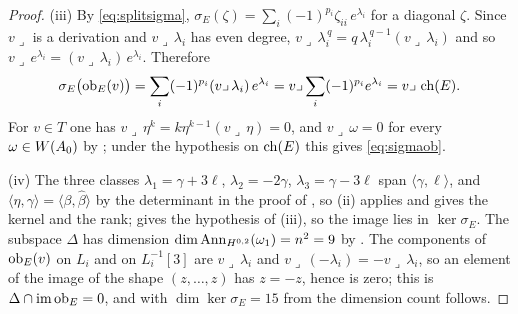 \begin{proof}
(iii) By \eqref{eq:splitsigma}, $\sigma_{E}(\zeta)=\sum_{i}(-1)^{p_{i}}
\zeta_{ii}\,e^{\lambda_{i}}$ for a diagonal $\zeta$. Since $v\lrcorner$ is a
derivation and $v\lrcorner\,\lambda_{i}$ has even degree,
$v\lrcorner\,\lambda_{i}^{\,q}=q\,\lambda_{i}^{\,q-1}(v\lrcorner\,\lambda_{i})$
and so $v\lrcorner\,e^{\lambda_{i}}=(v\lrcorner\,\lambda_{i})\,e^{\lambda_{i}}$.
Therefore
\[
  \sigma_{E}\bigl(\operatorname{ob}_{E}(v)\bigr)
  =\sum_{i}(-1)^{p_{i}}(v\lrcorner\,\lambda_{i})\,e^{\lambda_{i}}
  =v\lrcorner\sum_{i}(-1)^{p_{i}}e^{\lambda_{i}}
  =v\lrcorner\,\operatorname{ch}(E).
\]
For $v\in T$ one has $v\lrcorner\,\eta^{k}=k\eta^{k-1}(v\lrcorner\,\eta)=0$,
and $v\lrcorner\,\omega=0$ for every $\omega\in W(A_{0})$ by
\cite[Proposition~9.14]{paperI}; under the hypothesis on $\operatorname{ch}(E)$ this gives
\eqref{eq:sigmaob}.

(iv) The three classes $\lambda_{1}=\gamma+3\ell$, $\lambda_{2}=-2\gamma$,
$\lambda_{3}=\gamma-3\ell$ span $\langle\gamma,\ell\rangle$, and
$\langle\eta,\gamma\rangle=\langle\beta,\widehat\beta\rangle$ by the
determinant in the proof of , so (ii) applies and
gives the kernel and the rank;  gives the
hypothesis of (iii), so the image lies in $\ker\sigma_{E}$. The subspace
$\Delta$ has dimension $\dim\operatorname{Ann}_{H^{0,2}}(\omega_{1})=n^{2}=9$ by
\cite[Lemma~9.6]{paperI}. The components of $\operatorname{ob}_{E}(v)$ on $L_{i}$ and on
$L_{i}^{-1}[3]$ are $v\lrcorner\,\lambda_{i}$ and
$v\lrcorner\,(-\lambda_{i})=-v\lrcorner\,\lambda_{i}$, so an element of the
image of the shape $(z,\dots,z)$ has $z=-z$, hence is zero; this is
$\Delta\cap\operatorname{im}\operatorname{ob}_{E}=0$, and with $\dim\ker\sigma_{E}=15$ from
 the dimension count follows.
\end{proof}


